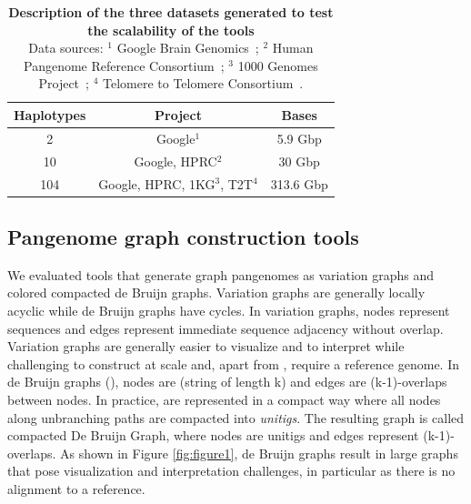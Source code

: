 \begin{table}
	\centering
	\setlength{\tabcolsep}{5pt} 
	\caption[Description of the three datasets generated to test the scalability of the tools.]{\textbf{Description of the three datasets generated to test the scalability of the tools}
		\\
		Data sources: 
		$^1$ Google Brain Genomics~\cite{google-assemblies}; $^2$ Human Pangenome Reference Consortium~\cite{HPRC-haplotypes}; $^3$ 1000 Genomes Project~\cite{HPRC-haplotypes}; $^4$ Telomere to Telomere Consortium~\cite{HPRC-haplotypes}.
		\label{tab:datasets}}
	\renewcommand{\arraystretch}{1.2}
	\begin{tabular}{|c c c|}
		\hline
		\centering
		Haplotypes & Project & Bases \\
		\hline
		2 & Google$^1$ & 5.9 Gbp\\
		10 & Google, HPRC$^2$ & 30 Gbp \\
		104 & Google, HPRC, 1KG$^3$, T2T$^4$ & 313.6 Gbp \\
		\hline
	\end{tabular}
\end{table}

\subsection*{\textbf{Pangenome graph construction tools}}
\label{sec:tools}

We evaluated tools that generate graph pangenomes as variation graphs and colored compacted de Bruijn graphs. Variation graphs are generally locally acyclic while de Bruijn graphs have cycles. In variation graphs, nodes represent sequences and edges represent immediate sequence adjacency without overlap. Variation graphs are generally easier to visualize and to interpret while challenging to construct at scale and, apart from \pggb, require a reference genome. In de Bruijn graphs (\dbg), nodes are \kmers (string of length k) and edges are (k-1)-overlaps between nodes. In practice, \dbgs are represented in a compact way where all nodes along unbranching paths are compacted into \emph{unitigs}. The resulting graph is called compacted De Bruijn Graph, where nodes are unitigs and edges represent (k-1)-overlaps. 
As shown in Figure \ref{fig:figure1}, de Bruijn graphs %
result in large graphs that pose visualization and interpretation challenges, in particular as there is no alignment to a reference.

